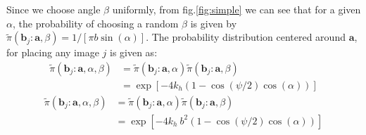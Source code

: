    Since we choose angle $\beta$ uniformly, from fig.\ref{fig:simple} we can see that for a given $\alpha$, the probability of choosing a random $\beta$ is given by $\tilde \pi({\mathbf b}_j: {\mathbf a}, \beta)  = 1/[\pi b \sin (\alpha)]$. The probability distribution centered around ${\mathbf a}$, for placing any image $j$ is given as:
    \ifkhExplicitP
        \begin{equation}
        \label{eq:piTildeAlphaBeta}
            \begin{aligned}
                \tilde \pi({\mathbf b}_j: {\mathbf a}, \alpha, \beta) &= \tilde \pi({\mathbf b}_j: {\mathbf a}, \alpha)  \tilde \pi({\mathbf b}_j: {\mathbf a}, \beta)\\
                &= \exp[-4k_h (1 - \cos(\psi/2) \cos(\alpha))]
            \end{aligned}
        \end{equation}
    \else
        \begin{equation}
        \label{eq:piTildeAlphaBeta}
            \begin{aligned}
                \tilde \pi({\mathbf b}_j: {\mathbf a}, \alpha, \beta) &= \tilde \pi({\mathbf b}_j: {\mathbf a}, \alpha)  \tilde \pi({\mathbf b}_j: {\mathbf a}, \beta)\\
                &= \exp[-4k_h~b^2 (1 - \cos(\psi/2) \cos(\alpha))]
            \end{aligned}
        \end{equation}
    \fi


